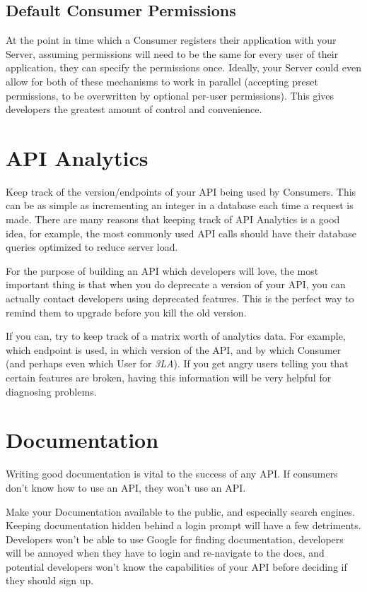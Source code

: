 \documentclass{book}
\begin{document}
\subsection{Default Consumer Permissions}

At the point in time which a Consumer registers their application with your Server, assuming permissions will need to be the same for every user of their application, they can specify the permissions once. Ideally, your Server could even allow for both of these mechanisms to work in parallel (accepting preset permissions, to be overwritten by optional per-user permissions). This gives developers the greatest amount of control and convenience.


\section{API Analytics}

Keep track of the version/endpoints of your API being used by Consumers. This can be as simple as incrementing an integer in a database each time a request is made. There are many reasons that keeping track of API Analytics is a good idea, for example, the most commonly used API calls should have their database queries optimized to reduce server load.

For the purpose of building an API which developers will love, the most important thing is that when you do deprecate a version of your API, you can actually contact developers using deprecated features. This is the perfect way to remind them to upgrade before you kill the old version.

If you can, try to keep track of a matrix worth of analytics data. For example, which endpoint is used, in which version of the API, and by which Consumer (and perhaps even which User for \emph{3LA}). If you get angry users telling you that certain features are broken, having this information will be very helpful for diagnosing problems.


\section{Documentation}

Writing good documentation is vital to the success of any API. If consumers don't know how to use an API, they won't use an API.

Make your Documentation available to the public, and especially search engines. Keeping documentation hidden behind a login prompt will have a few detriments. Developers won't be able to use Google for finding documentation, developers will be annoyed when they have to login and re-navigate to the docs, and potential developers won't know the capabilities of your API before deciding if they should sign up.
\end{document}
